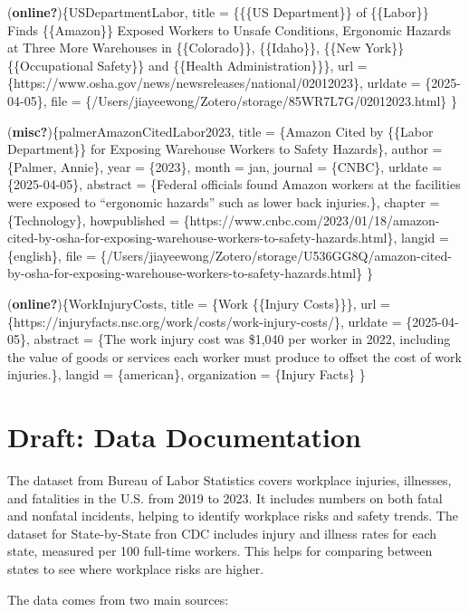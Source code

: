 \documentclass[
  letterpaper,
  DIV=11,
  numbers=noendperiod]{scrreprt}
\begin{document}
(\textbf{online?})\{USDepartmentLabor, title = \{\{\{US Department\}\}
of \{\{Labor\}\} Finds \{\{Amazon\}\} Exposed Workers to Unsafe
Conditions, Ergonomic Hazards at Three More Warehouses in
\{\{Colorado\}\}, \{\{Idaho\}\}, \{\{New York\}\} \textbar{}
\{\{Occupational Safety\}\} and \{\{Health Administration\}\}\}, url =
\{https://www.osha.gov/news/newsreleases/national/02012023\}, urldate =
\{2025-04-05\}, file =
\{/Users/jiayeewong/Zotero/storage/85WR7L7G/02012023.html\} \}

(\textbf{misc?})\{palmerAmazonCitedLabor2023, title = \{Amazon Cited by
\{\{Labor Department\}\} for Exposing Warehouse Workers to Safety
Hazards\}, author = \{Palmer, Annie\}, year = \{2023\}, month = jan,
journal = \{CNBC\}, urldate = \{2025-04-05\}, abstract = \{Federal
officials found Amazon workers at the facilities were exposed to
``ergonomic hazards'' such as lower back injuries.\}, chapter =
\{Technology\}, howpublished =
\{https://www.cnbc.com/2023/01/18/amazon-cited-by-osha-for-exposing-warehouse-workers-to-safety-hazards.html\},
langid = \{english\}, file =
\{/Users/jiayeewong/Zotero/storage/U536GG8Q/amazon-cited-by-osha-for-exposing-warehouse-workers-to-safety-hazards.html\}
\}

(\textbf{online?})\{WorkInjuryCosts, title = \{Work \{\{Injury
Costs\}\}\}, url =
\{https://injuryfacts.nsc.org/work/costs/work-injury-costs/\}, urldate =
\{2025-04-05\}, abstract = \{The work injury cost was \$1,040 per worker
in 2022, including the value of goods or services each worker must
produce to offset the cost of work injuries.\}, langid = \{american\},
organization = \{Injury Facts\} \}

\cleardoublepage
{}
{}
\appendix

\chapter{Draft: Data Documentation}\label{draft-data-documentation}

The dataset from Bureau of Labor Statistics covers workplace injuries,
illnesses, and fatalities in the U.S. from 2019 to 2023. It includes
numbers on both fatal and nonfatal incidents, helping to identify
workplace risks and safety trends. The dataset for State-by-State fron
CDC includes injury and illness rates for each state, measured per 100
full-time workers. This helps for comparing between states to see where
workplace risks are higher.

The data comes from two main sources:
\end{document}

